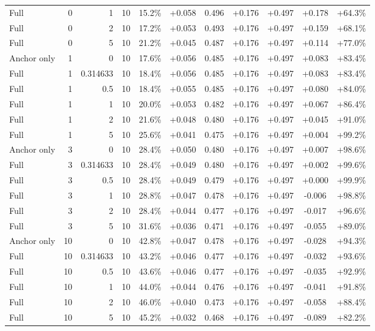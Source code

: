 \begin{table}[htbp]
\begin{tabular}{lrrrccccccc}
Full & 0 & 1 & 10 & 15.2\% & +0.058 & 0.496 & +0.176 & +0.497 & +0.178 & +64.3\% \\
Full & 0 & 2 & 10 & 17.2\% & +0.053 & 0.493 & +0.176 & +0.497 & +0.159 & +68.1\% \\
Full & 0 & 5 & 10 & 21.2\% & +0.045 & 0.487 & +0.176 & +0.497 & +0.114 & +77.0\% \\
Anchor only & 1 & 0 & 10 & 17.6\% & +0.056 & 0.485 & +0.176 & +0.497 & +0.083 & +83.4\% \\
Full & 1 & 0.314633 & 10 & 18.4\% & +0.056 & 0.485 & +0.176 & +0.497 & +0.083 & +83.4\% \\
Full & 1 & 0.5 & 10 & 18.4\% & +0.055 & 0.485 & +0.176 & +0.497 & +0.080 & +84.0\% \\
Full & 1 & 1 & 10 & 20.0\% & +0.053 & 0.482 & +0.176 & +0.497 & +0.067 & +86.4\% \\
Full & 1 & 2 & 10 & 21.6\% & +0.048 & 0.480 & +0.176 & +0.497 & +0.045 & +91.0\% \\
Full & 1 & 5 & 10 & 25.6\% & +0.041 & 0.475 & +0.176 & +0.497 & +0.004 & +99.2\% \\
Anchor only & 3 & 0 & 10 & 28.4\% & +0.050 & 0.480 & +0.176 & +0.497 & +0.007 & +98.6\% \\
Full & 3 & 0.314633 & 10 & 28.4\% & +0.049 & 0.480 & +0.176 & +0.497 & +0.002 & +99.6\% \\
Full & 3 & 0.5 & 10 & 28.4\% & +0.049 & 0.479 & +0.176 & +0.497 & +0.000 & +99.9\% \\
Full & 3 & 1 & 10 & 28.8\% & +0.047 & 0.478 & +0.176 & +0.497 & -0.006 & +98.8\% \\
Full & 3 & 2 & 10 & 28.4\% & +0.044 & 0.477 & +0.176 & +0.497 & -0.017 & +96.6\% \\
Full & 3 & 5 & 10 & 31.6\% & +0.036 & 0.471 & +0.176 & +0.497 & -0.055 & +89.0\% \\
Anchor only & 10 & 0 & 10 & 42.8\% & +0.047 & 0.478 & +0.176 & +0.497 & -0.028 & +94.3\% \\
Full & 10 & 0.314633 & 10 & 43.2\% & +0.046 & 0.477 & +0.176 & +0.497 & -0.032 & +93.6\% \\
Full & 10 & 0.5 & 10 & 43.6\% & +0.046 & 0.477 & +0.176 & +0.497 & -0.035 & +92.9\% \\
Full & 10 & 1 & 10 & 44.0\% & +0.044 & 0.476 & +0.176 & +0.497 & -0.041 & +91.8\% \\
Full & 10 & 2 & 10 & 46.0\% & +0.040 & 0.473 & +0.176 & +0.497 & -0.058 & +88.4\% \\
Full & 10 & 5 & 10 & 45.2\% & +0.032 & 0.468 & +0.176 & +0.497 & -0.089 & +82.2\% \\

\end{tabular}
\end{table}
